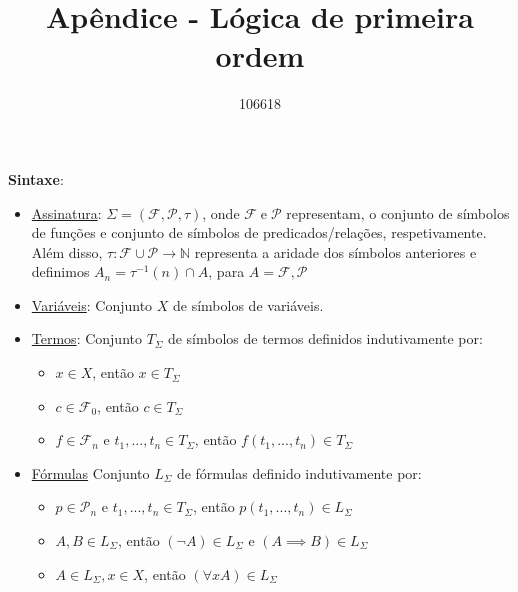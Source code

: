 \documentclass{article}
\title{Apêndice - Lógica de primeira ordem}
\author{106618 }
\date{}
\begin{document}
\maketitle

\textbf{Sintaxe}: 
\begin{itemize}
    \item \underline{Assinatura}: $\Sigma = (\mathcal{F}, \mathcal{P}, \tau)$, onde $\mathcal{F} \;\text{e}\;\mathcal{P}$ representam, o conjunto de símbolos de funções e conjunto de símbolos de predicados/relações, respetivamente. Além disso, $\tau: \mathcal{F} \cup \mathcal{P} \rightarrow \mathbb{N}$ representa a aridade dos símbolos anteriores e definimos $A_n= \tau^{-1}(n) \cap A$, para $A=\mathcal{F,P}$
    
    \item \underline{Variáveis}: Conjunto $X$ de símbolos de variáveis.\\

    \item  \underline{Termos}: Conjunto $T_\Sigma$ de símbolos de termos definidos indutivamente por:
       
        \begin{itemize}
            \renewcommand{\labelitemi}{-}
            \item $x\in X$, então $x \in T_\Sigma$
            \item $c \in \mathcal{F}_0$, então $c \in T_\Sigma$
            \item $f \in \mathcal{F}_n$ e $t_1,...,t_n \in T_\Sigma$, então $f(t_1,...,t_n) \in T_\Sigma$
        \end{itemize}

    \item \underline{Fórmulas} Conjunto $L_\Sigma$ de fórmulas definido indutivamente por:

        \begin{itemize}
            \renewcommand{\labelitemi}{-}
            \item $p \in \mathcal{P}_n$ e $t_1,...,t_n \in T_\Sigma$, então $p(t_1,...,t_n) \in L_\Sigma$
            \item $A,B \in L_\Sigma$, então $(\neg A) \in L_\Sigma$ e $(A \implies B) \in L_\Sigma$
            \item $A \in L_\Sigma, x\in X$, então $(\forall xA) \in L_\Sigma$
        \end{itemize}
\end{itemize}

\vspace{1cm}
\end{document}
